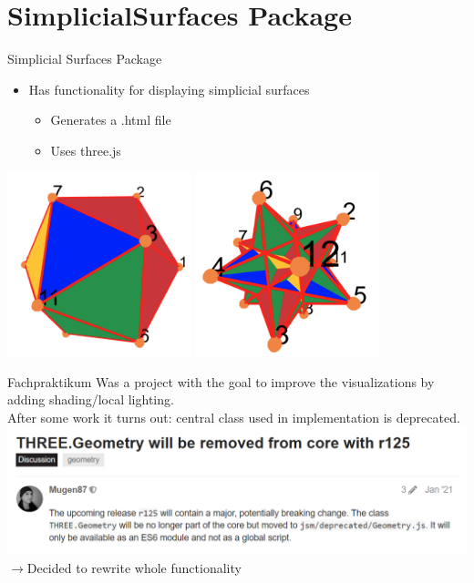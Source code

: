 \documentclass{beamer}
\numberwithin{equation}{aufgabe}
\begin{document}
\section{SimplicialSurfaces Package}
\begin{frame}{Simplicial Surfaces Package}
    \begin{itemize}[label=-]
        \item Has functionality for displaying simplicial surfaces
        \begin{itemize}[label=-]
            \item Generates a .html file
            \item Uses three.js
        \end{itemize}
    \end{itemize}
    \pause
    \begin{example}
        \includegraphics[width=0.4\textwidth]{images/ico-old.png}
        \includegraphics[width=0.4\textwidth]{images/ico2-1_old.png}
    \end{example}
\end{frame}

\begin{frame}
    \begin{exampleblock}{Fachpraktikum}
        Was a project with the goal to improve the visualizations by adding shading/local lighting.
        \pause \\
        After some work it turns out: central class used in implementation is deprecated.
        \includegraphics[width=1\textwidth]{images/three-deprecated.png}
        \pause \\ 
        $\xrightarrow{}$Decided to rewrite whole functionality
    \end{exampleblock}
\end{frame}
\end{document}

